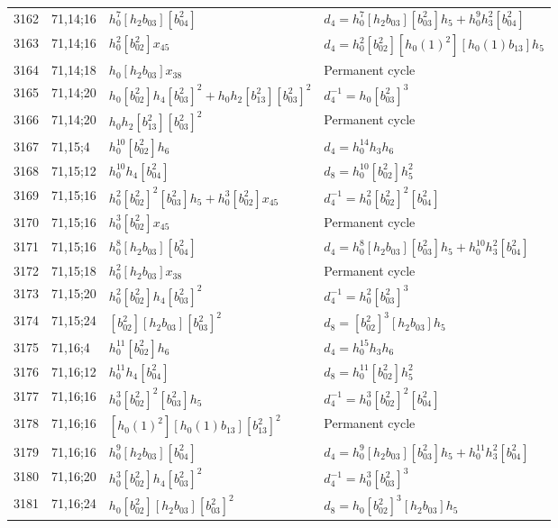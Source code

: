 \documentclass{article}
\begin{document}
\begin{longtable}{|l|l|>{\raggedright\arraybackslash}p{6cm}|>{\raggedright\arraybackslash}p{6cm}|}
3162 & 71,14;16 & $h_0^7[h_2b_{03}][b_{04}^2]$ &$d_{4}=h_0^7[h_2b_{03}][b_{03}^2]h_5 + h_0^9h_3^2[b_{04}^2]$\\
3163 & 71,14;16 & $h_0^2[b_{02}^2]x_{45}$ &$d_{4}=h_0^2[b_{02}^2][h_0(1)^2][h_0(1)b_{13}]h_5$\\
\hline
3164 & 71,14;18 & $h_0[h_2b_{03}]x_{38}$ & Permanent cycle\\
\hline
3165 & 71,14;20 & $h_0[b_{02}^2]h_4[b_{03}^2]^2 + h_0h_2[b_{13}^2][b_{03}^2]^2$ & $d_{4}^{-1}=h_0[b_{03}^2]^3$\\
3166 & 71,14;20 & $h_0h_2[b_{13}^2][b_{03}^2]^2$ & Permanent cycle\\
\hline
3167 & 71,15;4 & $h_0^{10}[b_{02}^2]h_6$ &$d_{4}=h_0^{14}h_3h_6$\\
\hline
3168 & 71,15;12 & $h_0^{10}h_4[b_{04}^2]$ &$d_{8}=h_0^{10}[b_{02}^2]h_5^2$\\
\hline
3169 & 71,15;16 & $h_0^2[b_{02}^2]^2[b_{03}^2]h_5 + h_0^3[b_{02}^2]x_{45}$ & $d_{4}^{-1}=h_0^2[b_{02}^2]^2[b_{04}^2]$\\
3170 & 71,15;16 & $h_0^3[b_{02}^2]x_{45}$ & Permanent cycle\\
3171 & 71,15;16 & $h_0^8[h_2b_{03}][b_{04}^2]$ &$d_{4}=h_0^8[h_2b_{03}][b_{03}^2]h_5 + h_0^{10}h_3^2[b_{04}^2]$\\
\hline
3172 & 71,15;18 & $h_0^2[h_2b_{03}]x_{38}$ & Permanent cycle\\
\hline
3173 & 71,15;20 & $h_0^2[b_{02}^2]h_4[b_{03}^2]^2$ & $d_{4}^{-1}=h_0^2[b_{03}^2]^3$\\
\hline
3174 & 71,15;24 & $[b_{02}^2][h_2b_{03}][b_{03}^2]^2$ &$d_{8}=[b_{02}^2]^3[h_2b_{03}]h_5$\\
\hline
3175 & 71,16;4 & $h_0^{11}[b_{02}^2]h_6$ &$d_{4}=h_0^{15}h_3h_6$\\
\hline
3176 & 71,16;12 & $h_0^{11}h_4[b_{04}^2]$ &$d_{8}=h_0^{11}[b_{02}^2]h_5^2$\\
\hline
3177 & 71,16;16 & $h_0^3[b_{02}^2]^2[b_{03}^2]h_5$ & $d_{4}^{-1}=h_0^3[b_{02}^2]^2[b_{04}^2]$\\
3178 & 71,16;16 & $[h_0(1)^2][h_0(1)b_{13}][b_{13}^2]^2$ & Permanent cycle\\
3179 & 71,16;16 & $h_0^9[h_2b_{03}][b_{04}^2]$ &$d_{4}=h_0^9[h_2b_{03}][b_{03}^2]h_5 + h_0^{11}h_3^2[b_{04}^2]$\\
\hline
3180 & 71,16;20 & $h_0^3[b_{02}^2]h_4[b_{03}^2]^2$ & $d_{4}^{-1}=h_0^3[b_{03}^2]^3$\\
\hline
3181 & 71,16;24 & $h_0[b_{02}^2][h_2b_{03}][b_{03}^2]^2$ &$d_{8}=h_0[b_{02}^2]^3[h_2b_{03}]h_5$\\

\end{longtable}
\end{document}
